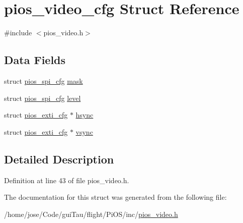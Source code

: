 \hypertarget{structpios__video__cfg}{\section{pios\-\_\-video\-\_\-cfg Struct Reference}
\label{structpios__video__cfg}
}


{\ttfamily \#include $<$pios\-\_\-video.\-h$>$}

\subsection*{Data Fields}
\begin{DoxyCompactItemize}
\item 
struct \hyperlink{structpios__spi__cfg}{pios\-\_\-spi\-\_\-cfg} \hyperlink{group___p_i_o_s___v_i_d_e_o_gac6699e31fbc588e69db444000ba7d44d}{mask}
\item 
struct \hyperlink{structpios__spi__cfg}{pios\-\_\-spi\-\_\-cfg} \hyperlink{group___p_i_o_s___v_i_d_e_o_gab3de6ddfa1d478f8062c895cad5d4793}{level}
\item 
struct \hyperlink{structpios__exti__cfg}{pios\-\_\-exti\-\_\-cfg} $\ast$ \hyperlink{group___p_i_o_s___v_i_d_e_o_ga01589e94ad18d5c8d12f72778539f8aa}{hsync}
\item 
struct \hyperlink{structpios__exti__cfg}{pios\-\_\-exti\-\_\-cfg} $\ast$ \hyperlink{group___p_i_o_s___v_i_d_e_o_ga489c20025b1facf5435c66ff616e1cd9}{vsync}
\end{DoxyCompactItemize}


\subsection{Detailed Description}


Definition at line 43 of file pios\-\_\-video.\-h.



The documentation for this struct was generated from the following file\-:\begin{DoxyCompactItemize}
\item 
/home/jose/\-Code/gui\-Tau/flight/\-Pi\-O\-S/inc/\hyperlink{pios__video_8h}{pios\-\_\-video.\-h}\end{DoxyCompactItemize}

